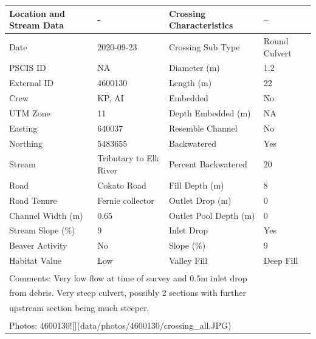 \documentclass[
]{book}
\begin{document}
\begin{tabular}{llll}
\toprule
Location and Stream Data & - & Crossing Characteristics & --\\
\midrule
Date & 2020-09-23 & Crossing Sub Type & Round Culvert\\
PSCIS ID & NA & Diameter (m) & 1.2\\
External ID & 4600130 & Length (m) & 22\\
Crew & KP, AI & Embedded & No\\
UTM Zone & 11 & Depth Embedded (m) & NA\\
\addlinespace
Easting & 640037 & Resemble Channel & No\\
Northing & 5483655 & Backwatered & Yes\\
Stream & Tributary to Elk River & Percent Backwatered & 20\\
Road & Cokato Road & Fill Depth (m) & 8\\
Road Tenure & Fernie collector & Outlet Drop (m) & 0\\
\addlinespace
Channel Width (m) & 0.65 & Outlet Pool Depth (m) & 0\\
Stream Slope (\%) & 9 & Inlet Drop & Yes\\
Beaver Activity & No & Slope (\%) & 9\\
Habitat Value & Low & Valley Fill & Deep Fill\\
\bottomrule
\multicolumn{4}{l}{\textsuperscript{} Comments: Very low flow at time of survey and 0.5m inlet drop}\\
\multicolumn{4}{l}{from debris. Very steep culvert, possibly 2 sections with further}\\
\multicolumn{4}{l}{upstream section being much steeper.}\\
\multicolumn{4}{l}{\textsuperscript{} Photos: 4600130![](data/photos/4600130/crossing\_all.JPG)}\\
\end{tabular}
\end{document}
